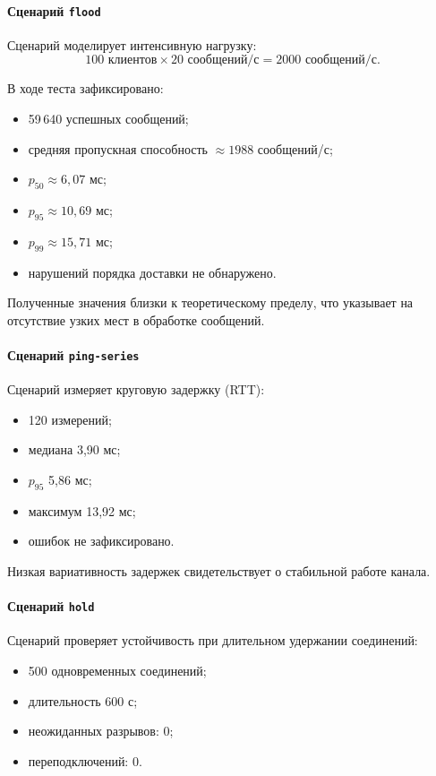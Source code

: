 \documentclass{article}
\begin{document}
\paragraph{Сценарий \texttt{flood}}

Сценарий моделирует интенсивную нагрузку:
\[
100 \text{ клиентов} \times 20 \text{ сообщений/с} = 2000 \text{ сообщений/с}.
\]

В ходе теста зафиксировано:
\begin{itemize}
\item 59\,640 успешных сообщений;
\item средняя пропускная способность $\approx 1988$ сообщений/с;
\item $p_{50} \approx 6{,}07$ мс;
\item $p_{95} \approx 10{,}69$ мс;
\item $p_{99} \approx 15{,}71$ мс;
\item нарушений порядка доставки не обнаружено.
\end{itemize}

Полученные значения близки к теоретическому пределу, что указывает на отсутствие узких мест в обработке сообщений.

\paragraph{Сценарий \texttt{ping-series}}

Сценарий измеряет круговую задержку (RTT):
\begin{itemize}
\item 120 измерений;
\item медиана 3{,}90 мс;
\item $p_{95}$ 5{,}86 мс;
\item максимум 13{,}92 мс;
\item ошибок не зафиксировано.
\end{itemize}

Низкая вариативность задержек свидетельствует о стабильной работе канала.

\paragraph{Сценарий \texttt{hold}}

Сценарий проверяет устойчивость при длительном удержании соединений:
\begin{itemize}
\item 500 одновременных соединений;
\item длительность 600 с;
\item неожиданных разрывов: 0;
\item переподключений: 0.
\end{itemize}
\end{document}
